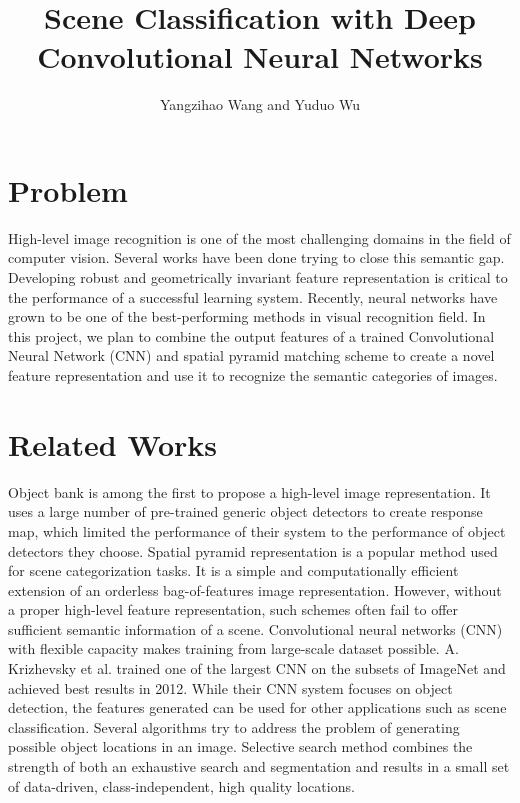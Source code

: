 \documentclass[letterpaper,twocolumn,10pt]{article}
\title{Scene Classification with Deep Convolutional Neural Networks}
\author{Yangzihao Wang and Yuduo Wu}
\begin{document}
\maketitle

\section{Problem}
High-level image recognition is one of the most challenging domains in the
field of computer vision. Several works have been done trying to close this
semantic gap. Developing robust and geometrically invariant feature
representation is critical to the performance of a successful learning system.
Recently, neural networks have grown to be one of the best-performing methods
in visual recognition field. In this project, we plan to combine the output
features of a trained Convolutional Neural Network (CNN) and spatial pyramid
matching scheme to create a novel feature representation and use it to
recognize the semantic categories of images.

\section{Related Works}
Object
bank\cite{OB} is among the first to propose a high-level image representation.
It uses a large number of pre-trained generic object detectors to create
response map, which limited the performance of their system to the performance
of object detectors they choose. Spatial pyramid representation\cite{SPM} is
a popular method used for scene categorization tasks. It is a simple and
computationally efficient extension of an orderless bag-of-features image
representation. However, without a proper high-level feature representation,
such schemes often fail to offer sufficient semantic information of a scene.
Convolutional neural networks (CNN) with flexible capacity makes training from
large-scale dataset possible. A. Krizhevsky et al.\cite{CNN} trained one of the
largest CNN on the subsets of ImageNet and achieved best results in 2012. While
their CNN system focuses on object detection, the features generated can be
used for other applications such as scene classification. Several algorithms
try to address the problem of generating possible object locations in an image.
Selective search method combines the strength of both an exhaustive search and
segmentation and results in a small set of data-driven, class-independent, high
quality locations.
\end{document}
